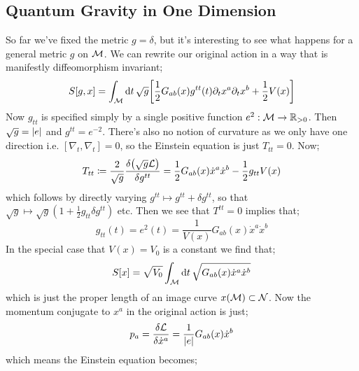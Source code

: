 \subsection{Quantum Gravity in One Dimension}
So far we've fixed the metric $g = \delta$, but it's interesting to see what happens for a general metric $g$ on $\mathcal{M}$. We can rewrite our original action in a way that is manifestly diffeomorphism invariant;\footnotemark
{}
\begin{equation}
S[g, x] = \int_{\mM}{\upd{t}\sqrt{g}\left[\frac{1}{2}G_{ab}(x)g^{tt}(t)\del_t x^{a}\del_{t}x^{b} + \frac{1}{2}V(x)\right]}
\end{equation}
Now $g_{tt}$ is specified simply by a single positive function $e^{2}:\mathcal{M} \rightarrow \mathbb{R}_{>0}$. Then $\sqrt{g} = \abs{e}$ and $g^{tt}= e^{-2}$. There's also no notion of curvature as we only have one direction i.e. $\left[\nabla_t, \nabla_t\right] = 0$, so the Einstein equation is just $T_{tt} = 0$. Now;
\begin{equation*}
T_{tt} \coloneqq \frac{2}{\sqrt{g}}\frac{\delta\left(\sqrt{g}\mL\right)}{\delta g^{tt}} = \frac{1}{2}G_{ab}(x)\dot{x}^{a}\dot{x}^{b} - \frac{1}{2}g_{tt}V(x)
\end{equation*}
which follows by directly varying $g^{tt} \mapsto g^{tt} + \delta g^{tt}$, so that $\sqrt{g} \mapsto \sqrt{g}(1 + \tfrac{1}{2}g_{tt}\delta g^{tt})$ etc. Then we see that $T^{tt} = 0$ implies that;
\begin{equation}
g_{tt}(t) = e^{2}(t) = \frac{1}{V(x)}G_{ab}(x)\dot{x}^{a}\dot{x}^{b}
\end{equation}
In the special case that $V(x) = V_0$ is a constant we find that;
\begin{equation*}
S[x] = \sqrt{V_0}\int_{\mathcal{M}}{\text{d}t \,\sqrt{G_{ab}(x)\dot{x}^{a}\dot{x}^{b}}}
\end{equation*}
which is just the proper length of an image curve $x(\mathcal{M}) \subset \mathcal{N}$. Now the momentum conjugate to $x^{a}$ in the original action is just;
\begin{equation*}
p_a = \frac{\delta \mL}{\delta \dot{x}^{a}} = \frac{1}{\abs{e}}G_{ab}(x)\dot{x}^{b}
\end{equation*}
which means the Einstein equation becomes;
